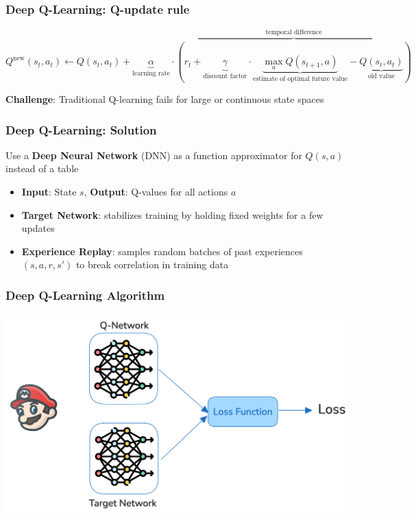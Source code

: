 \begin{frame}
	\frametitle{Deep Q-Learning: Q-update rule}
	\vspace{1cm}
		
			
		$$Q^{\text{new}}(s_t, a_t) \leftarrow Q(s_t, a_t) 
		+ \underbrace{\alpha}_{\text{learning rate}} \cdot 
		\overbrace{\left( r_t + \underbrace{\gamma}_{\text{discount factor}} 
		\cdot \underbrace{\max_a Q(s_{t+1}, a)}_{\text{estimate of optimal future value}} 
		- \underbrace{Q(s_t, a_t)}_{\text{old value}} \right)}^{\text{temporal difference}}$$
		
		\vspace{1cm}
		\pause
		\centering
		\textbf{Challenge}: Traditional Q-learning fails for large or continuous state spaces
\end{frame}

\begin{frame}
	\frametitle{Deep Q-Learning: Solution }
	\vspace{0.5cm}
	Use a \textbf{Deep Neural Network} (DNN) as a function approximator for $Q(s,a)$ instead of a table
		\begin{itemize}		
			\item  \textbf{Input}: State $s$, \textbf{Output}: Q-values for all actions $a$
			\item \textbf{Target Network}: stabilizes training by holding fixed weights for a few updates
			\item \textbf{Experience Replay}: samples random batches of past experiences $(s,a,r,s')$ to break correlation in training data
		\end{itemize}
\end{frame}

\begin{frame}
	\frametitle{Deep Q-Learning Algorithm}
	\vspace{1cm}
	\centering
	\includegraphics[scale=0.2]{lossfunction}
\end{frame}

